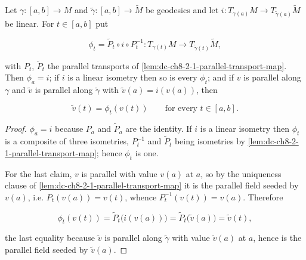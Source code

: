 \begin{lemma}
  \label{lem:dc-ch8-2-1-phi}
  \leanok
  Let $\gamma:[a,b]\to M$ and $\tilde\gamma:[a,b]\to\tilde M$ be geodesics and let
  $i:T_{\gamma(a)}M\to T_{\tilde\gamma(a)}\tilde M$ be linear. For $t\in[a,b]$ put

  $$
  \phi_t=\tilde P_t\circ i\circ P_t^{-1}:
  T_{\gamma(t)}M\longrightarrow T_{\tilde\gamma(t)}\tilde M,
  $$

  with $P_t$, $\tilde P_t$ the parallel transports of
  \cref{lem:dc-ch8-2-1-parallel-transport-map}. Then $\phi_a=i$; if $i$ is a linear isometry
  then so is every $\phi_t$; and if $v$ is parallel along $\gamma$ and $\tilde v$ is parallel
  along $\tilde\gamma$ with $\tilde v(a)=i(v(a))$, then

  $$
  \tilde v(t)=\phi_t(v(t))\qquad\text{for every }t\in[a,b].
  $$

\end{lemma}
\begin{proof}
  \leanok
\sketch
  $\phi_a=i$ because $P_a$ and $\tilde P_a$ are the identity. If $i$ is a linear isometry then
  $\phi_t$ is a composite of three isometries, $P_t^{-1}$ and $\tilde P_t$ being isometries by
  \cref{lem:dc-ch8-2-1-parallel-transport-map}; hence $\phi_t$ is one.

  For the last claim, $v$ is parallel with value $v(a)$ at $a$, so by the uniqueness clause of
  \cref{lem:dc-ch8-2-1-parallel-transport-map} it is the parallel field seeded by $v(a)$, i.e.
  $P_t(v(a))=v(t)$, whence $P_t^{-1}(v(t))=v(a)$. Therefore

  $$
  \phi_t(v(t))=\tilde P_t\big(i(v(a))\big)=\tilde P_t\big(\tilde v(a)\big)=\tilde v(t),
  $$

  the last equality because $\tilde v$ is parallel along $\tilde\gamma$ with value $\tilde v(a)$
  at $a$, hence is the parallel field seeded by $\tilde v(a)$.
\end{proof}


